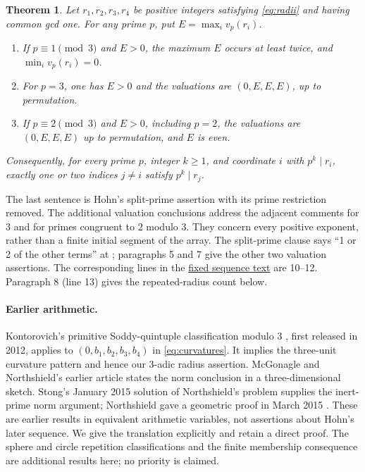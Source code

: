 \documentclass[11pt]{article}
\newtheorem{theorem}{Theorem}
\begin{document}
\begin{theorem}\label{thm:main}
Let $r_1,r_2,r_3,r_4$ be positive integers satisfying \eqref{eq:radii}
and having common gcd one. For any prime $p$, put
$E=\max_i v_p(r_i)$.
\begin{enumerate}
\item If $p\equiv1\pmod3$ and $E>0$, the maximum $E$ occurs at least
twice, and $\min_i v_p(r_i)=0$.
\item For $p=3$, one has $E>0$ and the valuations are $(0,E,E,E)$,
up to permutation.
\item If $p\equiv2\pmod3$ and $E>0$, including $p=2$, the valuations
are $(0,E,E,E)$ up to permutation, and $E$ is even.
\end{enumerate}
Consequently, for every prime $p$, integer $k\ge1$, and coordinate $i$
with $p^k\mid r_i$, exactly one or two indices $j\ne i$ satisfy
$p^k\mid r_j$.
\end{theorem}

The last sentence is Hohn's split-prime assertion with its prime restriction
removed. The additional valuation conclusions address the adjacent comments
for $3$ and for primes congruent to $2$ modulo $3$. They concern every
positive exponent, rather than a finite initial segment of the array.
The split-prime clause says ``1 or 2 of the other terms'' at
\cite[COMMENTS, paragraph 6]{hohn}; paragraphs 5 and 7 give the other
two valuation assertions. The corresponding lines in the
\href{https://raw.githubusercontent.com/oeis/oeisdata/d4ade8b4ca7c6ff0ac8931532918fd4f6176805e/seq/A390/A390148.seq}{fixed sequence text}
are 10--12. Paragraph 8 (line 13) gives the repeated-radius count below.

\paragraph{Earlier arithmetic.}
Kontorovich's primitive Soddy-quintuple classification modulo $3$
\cite[Lemma 2.11, p.~9]{kontorovich}, first released in 2012, applies
to $(0,b_1,b_2,b_3,b_4)$ in \eqref{eq:curvatures}. It implies the
three-unit curvature pattern and hence our $3$-adic radius assertion.
McGonagle and Northshield's earlier article \cite[Section 6]{mcgonagle}
states the norm conclusion in a three-dimensional sketch.
Stong's January 2015 solution of Northshield's problem
\cite[p.~76]{stong} supplies the inert-prime norm argument;
Northshield gave a geometric proof in March 2015
\cite[Corollary 4.6, p.~14]{northshield}.
These are earlier results in equivalent arithmetic variables, not
assertions about Hohn's later sequence. We give the translation explicitly
and retain a direct proof. The sphere and circle repetition classifications
and the finite membership consequence are additional results here;
no priority is claimed.
\end{document}
